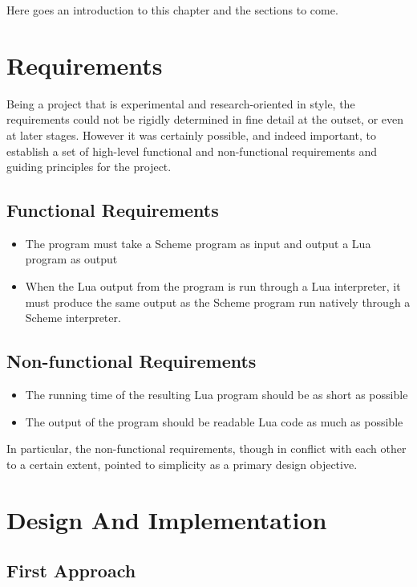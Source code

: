 Here goes an introduction to this chapter and the sections to come.


\section{Requirements}

Being a project that is experimental and research-oriented in style, the
requirements could not be rigidly determined in fine detail at the outset, or
even at later stages. However it was certainly possible, and indeed important,
to establish a set of high-level functional and non-functional requirements and
guiding principles for the project.

\subsection{Functional Requirements}

\begin{itemize}
\item The program must take a Scheme program as input and output a Lua program
as output
\item When the Lua output from the program is run through a Lua interpreter, it
must produce the same output as the Scheme program run natively through a Scheme
interpreter.
\end{itemize}

\subsection{Non-functional Requirements}

\begin{itemize}
\item The running time of the resulting Lua program should be as short as
possible
\item The output of the program should be readable Lua code as much as possible
\end{itemize}

In particular, the non-functional requirements, though in conflict with each
other to a certain extent, pointed to simplicity as a primary design objective.


\section{Design And Implementation}

\subsection{First Approach}

